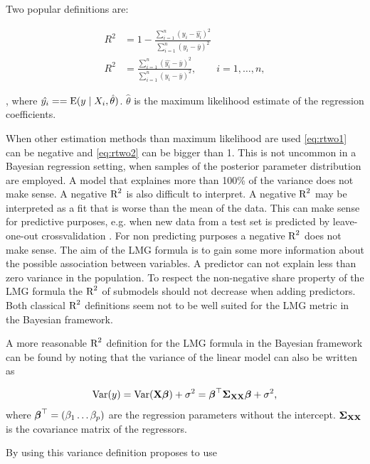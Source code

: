 \documentclass[11pt,a4paper,twoside]{book}\usepackage[]{graphicx}\usepackage[]{color}
\begin{document}
Two popular definitions are:
   
      \begin{align} 
     R^2 &= 1 - \frac{\sum_{i=1}^{n}(y_{i} - \hat{y_{i}})^2}{\sum_{i=1}^{n}(y_{i}-\bar{y})^2}   \label{eq:rtwo1} \\
     R^2 &= \frac{\sum_{i=1}^{n}(\hat{y_{i}} - \bar{y})^2}{\sum_{i=1}^{n}(y_{i}-\bar{y})^2}, \qquad i = 1,\dots,n,   \label{eq:rtwo2} 
   \end{align} 
   
, where $\hat{y_{i}} = = \operatorname{E} ({y \mid X_{i}, \hat{\theta}})$.  $\hat{\theta}$ is the maximum likelihood estimate of the regression coefficients.


When other estimation methods than maximum likelihood are used \eqref{eq:rtwo1} can be negative and \eqref{eq:rtwo2}  can be bigger than 1. This is not uncommon in a Bayesian regression setting, when samples of the posterior parameter distribution are employed. A model that explaines more than 100\% of the variance does not make sense. A negative $\text{R}^2$ is also difficult to interpret. A negative $\text{R}^2$ may be interpreted as a fit that is worse than the mean of the data. This can make sense for predictive purposes, e.g. when new data from a test set is predicted by leave-one-out crossvalidation \citep{Alexander2015}.  For non predicting purposes a negative $\text{R}^2$ does not make sense. The aim of the LMG formula is to gain some more information about the possible association between variables. A predictor can not explain less than zero variance in the population. To respect the non-negative share property of the LMG formula the $\text{R}^2$ of submodels should not decrease when adding predictors. Both classical $\text{R}^2$ definitions seem not to be well suited for the LMG metric in the Bayesian framework.

A more reasonable $\text{R}^2$ definition for the LMG formula in the Bayesian framework can be found by noting that the variance of the linear model can also be written as 

      \begin{align} 
        \operatorname{Var}(y) = \operatorname{Var}({\mathbf{X}} {\boldsymbol{\beta}}) + \sigma^2 = {\boldsymbol{\beta}}^\top {\boldsymbol{\Sigma}}{}_{{\mathbf{X}} {\mathbf{X}}}  {\boldsymbol{\beta}} + \sigma^2, \label{eq:vary} 
   \end{align}
where ${\boldsymbol{\beta}}^\top = (\beta_{1} \dots \beta_{p})$ are the regression parameters without the intercept.
${\boldsymbol{\Sigma}}{}_{{\mathbf{X}} {\mathbf{X}}}$ is the covariance matrix of the regressors.

By using this variance definition \cite{Gelman2017} proposes to use 
\end{document}
